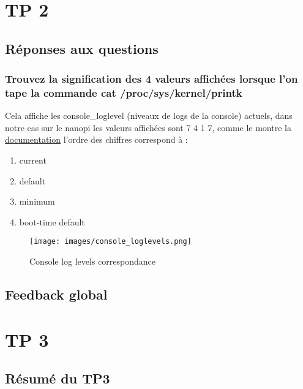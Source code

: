 \documentclass{ReportTemplate}
\begin{document}
\chapter{TP 2}
\section{Réponses aux questions}
\subsection{Trouvez la signification des 4 valeurs affichées lorsque l’on tape la commande cat /proc/sys/kernel/printk}
Cela affiche les console\_loglevel (niveaux de logs de la console) actuels, dans notre cas sur le nanopi les valeurs affichées sont 7 4 1 7, comme le montre la \href{https://www.kernel.org/doc/html/latest/core-api/printk-basics.html}{documentation} l'ordre des chiffres correspond à :
\begin{enumerate}
    \item current
    \item default
    \item minimum
    \item boot-time default
\end{enumerate}

\begin{figure}[H]
    \centering
    \texttt{[image: images/console\_loglevels.png]}
    \caption{Console log levels correspondance}
    \label{fig:LogLevels}
\end{figure}

\section{Feedback global}

\chapter{TP 3}
\section{Résumé du TP3}
\end{document}
